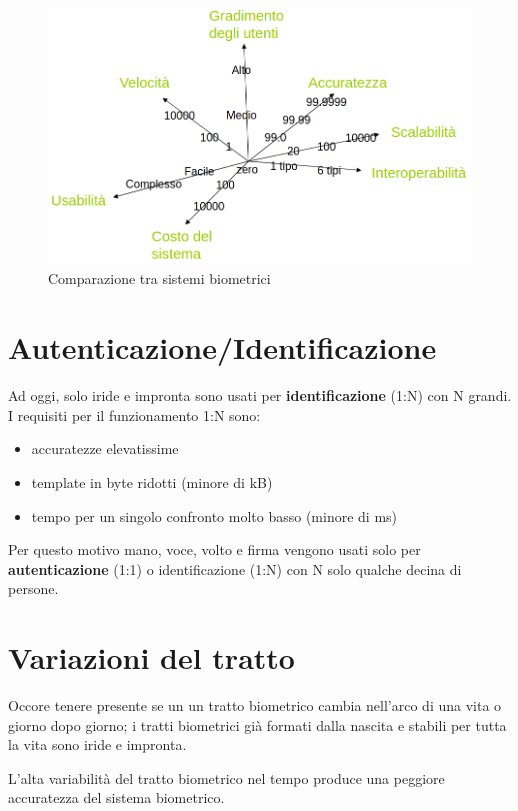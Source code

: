 \documentclass{report}
\begin{document}
\begin{figure}[h]
    \centering
    \includegraphics[width=0.95\linewidth]{images/comparazione.png}
    \caption{Comparazione tra sistemi biometrici}
    \label{fig:comparazione}
\end{figure}

\newpage
\section{Autenticazione/Identificazione}

Ad oggi, solo iride e impronta sono usati per \textbf{identificazione} (1:N) con N grandi. I requisiti per il funzionamento 1:N sono:
\begin{itemize}
    \item accuratezze elevatissime
    \item template in byte ridotti (minore di kB)
    \item tempo per un singolo confronto molto basso (minore di ms)
\end{itemize}

\noindent Per questo motivo mano, voce, volto e firma vengono usati solo per \textbf{autenticazione} (1:1) o identificazione (1:N) con N solo qualche decina di persone.

\section{Variazioni del tratto}

Occore tenere presente se un un tratto biometrico cambia nell'arco di una vita o giorno dopo giorno; i tratti biometrici già formati dalla nascita e stabili per tutta la vita sono iride e impronta.

\noindent L'alta variabilità del tratto biometrico nel tempo produce una peggiore accuratezza del sistema biometrico.
\end{document}
